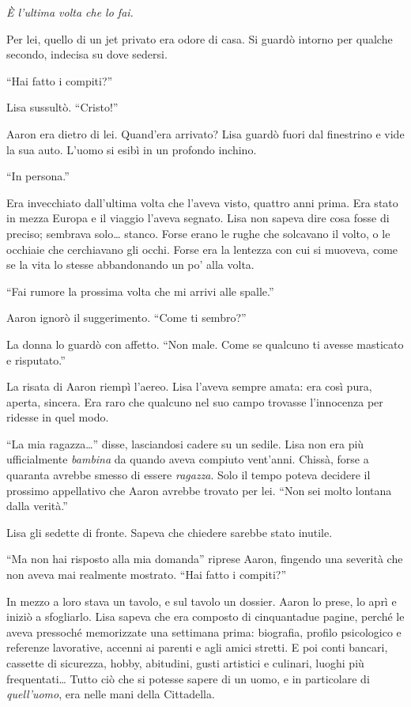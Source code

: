 \emph{È l'ultima volta che lo fai.}

Per lei, quello di un jet privato era odore di casa. Si guardò intorno per qualche secondo, indecisa
su dove sedersi.

``Hai fatto i compiti?''

Lisa sussultò. ``Cristo!''

Aaron era dietro di lei. Quand'era arrivato? Lisa guardò fuori dal finestrino e vide la sua auto.
L'uomo si esibì in un profondo inchino.

``In persona.''

Era invecchiato dall'ultima volta che l'aveva visto, quattro anni prima. Era stato in mezza Europa e
il viaggio l'aveva segnato. Lisa non sapeva dire cosa fosse di preciso; sembrava solo\dots{} stanco.
Forse erano le rughe che solcavano il volto, o le occhiaie che cerchiavano gli occhi. Forse era la
lentezza con cui si muoveva, come se la vita lo stesse abbandonando un po' alla volta.

``Fai rumore la prossima volta che mi arrivi alle spalle.''

Aaron ignorò il suggerimento. ``Come ti sembro?''

La donna lo guardò con affetto. ``Non male. Come se qualcuno ti avesse masticato e risputato.''

La risata di Aaron riempì l'aereo. Lisa l'aveva sempre amata: era così pura, aperta, sincera. Era
raro che qualcuno nel suo campo trovasse l'innocenza per ridesse in quel modo.

``La mia ragazza\dots{}'' disse, lasciandosi cadere su un sedile. Lisa non era più ufficialmente
\emph{bambina} da quando aveva compiuto vent'anni. Chissà, forse a quaranta avrebbe smesso di essere
\emph{ragazza}. Solo il tempo poteva decidere il prossimo appellativo che Aaron avrebbe trovato per
lei. ``Non sei molto lontana dalla verità.''

Lisa gli sedette di fronte. Sapeva che chiedere sarebbe stato inutile.

``Ma non hai risposto alla mia domanda'' riprese Aaron, fingendo una severità che non aveva mai
realmente mostrato. ``Hai fatto i compiti?''

In mezzo a loro stava un tavolo, e sul tavolo un dossier. Aaron lo prese, lo aprì e iniziò a
sfogliarlo. Lisa sapeva che era composto di cinquantadue pagine, perché le aveva pressoché
memorizzate una settimana prima: biografia, profilo psicologico e referenze lavorative, accenni ai
parenti e agli amici stretti. E poi conti bancari, cassette di sicurezza, hobby, abitudini, gusti
artistici e culinari, luoghi più frequentati\dots{} Tutto ciò che si potesse sapere di un uomo, e in
particolare di \emph{quell'uomo}, era nelle mani della Cittadella.

